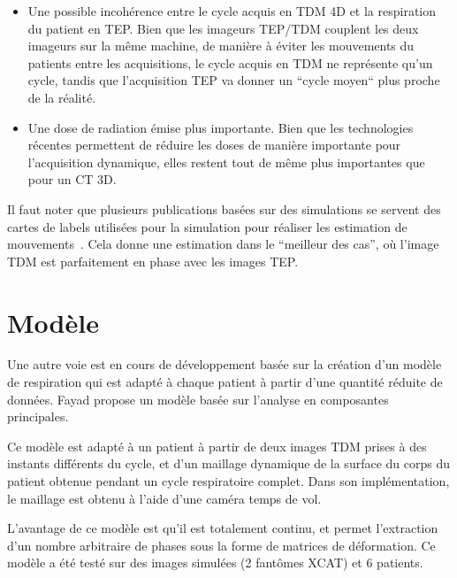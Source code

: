 \begin{itemize}
 \item Une possible incohérence entre le cycle acquis en TDM 4D et la respiration du patient en TEP. Bien que les imageurs TEP/TDM couplent les deux imageurs sur la même machine, de manière à éviter les mouvements du patients entre les acquisitions, le cycle acquis en TDM ne représente qu'un cycle, tandis que l'acquisition TEP va donner un ``cycle moyen`` plus proche de la réalité.
 \item Une dose de radiation émise plus importante. Bien que les technologies récentes permettent de réduire les doses de manière importante pour l'acquisition dynamique, elles restent tout de même plus importantes que pour un CT 3D.
\end{itemize}

Il faut noter que plusieurs publications basées sur des simulations se servent des cartes de labels utilisées pour la simulation pour réaliser les estimation de mouvements~\cite{lamare2007list}. Cela donne une estimation dans le ``meilleur des cas'', où l'image TDM est parfaitement en phase avec les images TEP.

\section{Modèle}

Une autre voie est en cours de développement basée sur la création d'un modèle de respiration qui est adapté à chaque patient à partir d'une quantité réduite de données. Fayad \cite{fayad2010application} propose un modèle basée sur l'analyse en composantes principales. 

Ce modèle est adapté à un patient à partir de deux images TDM prises à des instants différents du cycle, et d'un maillage dynamique de la surface du corps du patient obtenue pendant un cycle respiratoire complet. Dans son implémentation, le maillage est obtenu à l'aide d'une caméra temps de vol.

L'avantage de ce modèle est qu'il est totalement continu, et permet l'extraction d'un nombre arbitraire de phases sous la forme de matrices de déformation. Ce modèle a été testé sur des images simulées (2 fantômes XCAT) et 6 patients.
